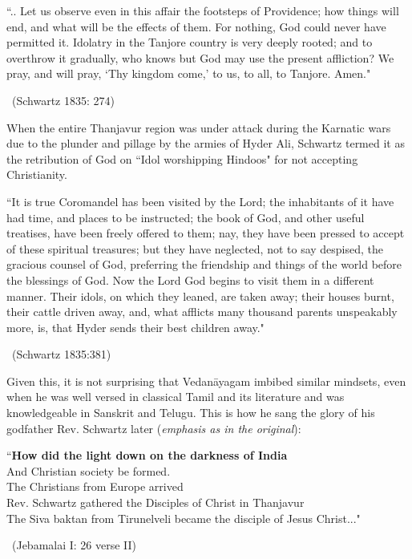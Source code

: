 \begin{myquote}
``.. Let us observe even in this affair the footsteps of Providence; how things will end, and what will be the effects of them. For nothing, God could never have permitted it. Idolatry in the Tanjore country is very deeply rooted; and to overthrow it gradually, who knows but God may use the present affliction? We pray, and will pray, `Thy kingdom come,' to us, to all, to Tanjore. Amen." 

~\hfill (Schwartz 1835: 274)
\end{myquote}

When the entire Thanjavur region was under attack during the Karnatic wars due to the plunder and pillage by the armies of Hyder Ali, Schwartz termed it as the retribution of God on ``Idol worshipping Hindoos" for not accepting Christianity.

\begin{myquote}
``It is true Coromandel has been visited by the Lord; the inhabitants of it have had time, and places to be instructed; the book of God, and other useful treatises, have been freely offered to them; nay, they have been pressed to accept of these spiritual treasures; but they have neglected, not to say despised, the gracious counsel of God, preferring the friendship and things of the world before the blessings of God. Now the Lord God begins to visit them in a different manner. Their idols, on which they leaned, are taken away; their houses burnt, their cattle driven away, and, what afflicts many thousand parents unspeakably more, is, that Hyder sends their best children away." 

~\hfill (Schwartz 1835:381)
\end{myquote}

\newpage

Given this, it is not surprising that Vedanāyagam imbibed similar mindsets, even when he was well versed in classical Tamil and its literature and was knowledgeable in Sanskrit and Telugu. This is how he sang the glory of his godfather Rev. Schwartz later (\textit{emphasis as in the original}):

\begin{myquote}
``\textbf{How did the light down on the darkness of India}\\ And Christian society be formed.\\ The Christians from Europe arrived\\ Rev. Schwartz gathered the Disciples of Christ in Thanjavur\\ The Siva baktan from Tirunelveli became the disciple of Jesus Christ..." 

~\hfill (Jebamalai I: 26 verse II)
\end{myquote}

